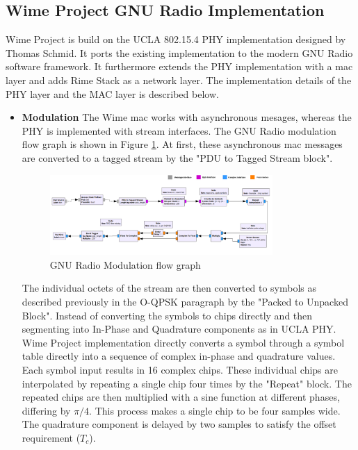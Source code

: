 \subsection{Wime Project GNU Radio Implementation}
Wime Project is build on the UCLA 802.15.4 PHY implementation designed  by Thomas Schmid.
It ports the existing implementation to the modern GNU Radio software framework.
It furthermore extends the PHY implementation with a \ac{mac} layer and adds Rime Stack as a network layer.
The implementation details of the PHY layer and the MAC layer is described below.\\

\begin{itemize}

\item{\textbf{Modulation} The Wime \ac{mac} works with asynchronous mesages, whereas the \ac{PHY} is implemented with stream interfaces.
The GNU Radio modulation flow graph is shown in Figure \ref{TX flow graph}.
At first, these asynchronous \ac{mac} messages are converted to a tagged stream by the "PDU to Tagged Stream block".
\begin{figure}[h!]
\centering
\includegraphics[width=0.8\textwidth]{Figure/TXPath.png}
\caption{GNU Radio Modulation flow graph}
\label{TX flow graph}
\end{figure}

The individual octets of the stream are then converted to symbols as described previously in the \ac{O-QPSK} paragraph by the "Packed to Unpacked Block".
Instead of converting the symbols to chips directly and then segmenting into In-Phase and Quadrature components as in UCLA PHY.
Wime Project implementation directly converts a symbol through a symbol table directly into a sequence of complex in-phase and quadrature values.
Each symbol input results in 16 complex chips.
These individual chips are interpolated by repeating a single chip four times by the "Repeat" block.
The repeated chips are then multiplied with a sine function at different phases, differing by $\pi/4$.
This process makes a single chip to be four samples wide.
The quadrature component is delayed by two samples to satisfy the offset requirement ($T_c$).}


\end{itemize}
